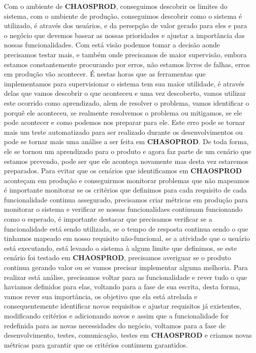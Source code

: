       Com o ambiente de \textbf{CHAOSPROD}, conseguimos descobrir os limites do
      sistema, com o ambiente de produção, conseguimos descobrir como o sistema é
      utilizado, é através dos usuários, e da persepção de valor gerado para eles
      e para o negócio que devemos basear as nossas prioridades e ajustar a
      importância das nossas funcionalidades. Com está visão podemos tomar a decisão
      aonde precisamos testar mais, e também onde precisamos de maior supervisão,
      embora estamos constantemente procurando por erros, não estamos livres de
      falhas, erros em produção vão acontecer. É nestas horas que as ferramentas
      que implementamos para supervisionar o sistema tem sua maior utilidade, é
      através delas que vamos descobrir o que aconteceu e uma vez descoberto, vamos
      utilizar este ocorrido como aprendizado, alem de resolver o problema, vamos
      identificar o porquê ele aconteceu, se realmente resolvemos o problema ou
      mitigamos, se ele pode acontecer e como podemos nos preparar para ele. Este
      erro pode se tornar mais um teste automatizado para ser realizado durante os
      desenvolvimentos ou pode se tornar mais uma análise a ser feita em
      \textbf{CHASOPROD}. De toda forma, ele se tornou um aprendizado para o produto
      e agora faz parte de um cenário que estamos prevendo, pode ser que ele
      aconteça novamente mas desta vez estaremos preparados. \newline
      Para evitar que os cenários que identificamos em \textbf{CHAOSPROD} aconteçam
      em produção e conseguirmos monitorar problemas que não mapeamos é importante
      monitorar se os critérios que definimos para cada requisito de cada funcionalidade
      continua assegurado, precisamos criar métricas em produção para monitorar
      o sistema e verificar se nossas funcionalidaes continuam funcionando como o
      esperado, é importante destacar que precisamos verificar se a funcionalidade
      está sendo utilizada, se o tempo de resposta continua sendo o que tinhamos
      mapeado em nosso requisito não-funcional, se a atividade que o usuário está
      executando, está levando o sistema à algum limite que definimos, se este
      cenário foi testado em \textbf{CHAOSPROD}, precisamos averiguar se o
      produto continua gerando valor ou se vamos precisar implementar alguma
      melhoria. Para realizar está análise, precisamos voltar para as funcionalidade
      e rever tudo o que haviamos definidos para elas, voltando para a fase de
      sua escrita, desta forma, vamos rever sua importância, os objetivo que ela
      está atrelada e consequentemente identificar novos requisitos e ajustar
      requisitos já existentes, modificando critérios e adicionando novos e
      assim que a funcionalidade for redefinida para as novas necessidades do
      negócio, voltamos para a fase de desenvolvimento, testes, comunicação,
      testes em \textbf{CHAOSPROD} e criamos novas métricas para garantir que
      os critérios continuem garantidos.

